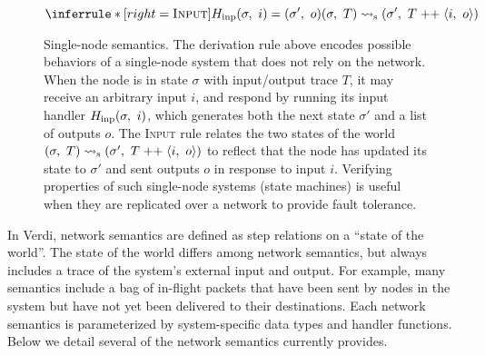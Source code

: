 \begin{figure}[t]
  \centering

  \begin{footnotesize} \begin{spacing}{1.5} \[
    \inferrule*[right=\textsc{Input}]{
      \fHinp(\sigma,\ i) = (\sigma',\ o)
    }{
      (\sigma,\ T) \fsmstep (\sigma',\ T \appop \traceelt{i,\ o})
    }
  \] \end{spacing} \end{footnotesize}

  \caption{Single-node semantics.
  The derivation rule above encodes possible behaviors of a single-node
  system that does not rely on the network.
  When the node is in state $\sigma$ with input/output trace $T$, it may
  receive an arbitrary input $i$, and respond by running its input handler
  $H_{\mathrm{inp}}(\sigma,\ i)$, which generates both the next state $\sigma'$ and a list of
  outputs $o$.
  The \textsc{Input} rule relates the two states of the world $(\sigma,\ T) \leadsto_{\mathrm{s}}
  (\sigma',\ T \;{\text{++}}\; \langle i,\ o \rangle)$ to reflect that the node has updated
  its state to $\sigma'$ and sent outputs $o$ in response to input $i$.
  Verifying properties of such single-node systems (\ie state machines) is
useful when they are replicated over a network to provide fault tolerance.}

\label{fig:state-machine-semantics}
\end{figure}

In Verdi, network semantics are defined as step relations on a ``state of
the world''.
%
The state of the world differs among network semantics, but always includes
a trace of the system's external input and output.
%
For example, many semantics include a bag of in-flight packets
that have been sent by nodes in the system but have not yet been delivered
to their destinations.
%
Each network semantics is parameterized by system-specific data types and
handler functions.
%
Below we detail several of the network semantics \Verdi currently provides.

